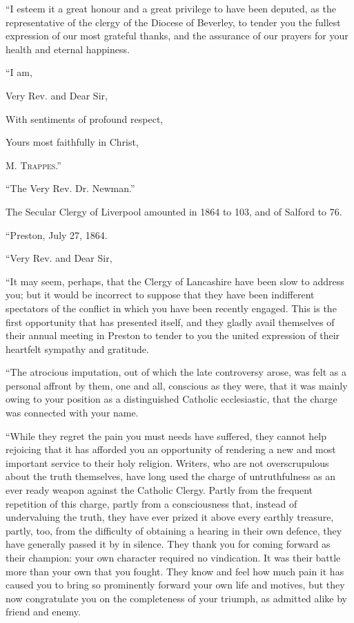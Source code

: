 ``I esteem it a great honour and a great privilege to have been
deputed, as the representative of the clergy of the Diocese of Beverley,
to tender you the fullest expression of our most grateful thanks, and
the assurance of our prayers for your health and eternal happiness.

``I am,

Very Rev. and Dear Sir,

With sentiments of profound respect,

Yours most faithfully in Christ,

M. T\textsc{rappes}.''

``The Very Rev. Dr. Newman.''


The Secular Clergy of Liverpool amounted in 1864 to 103, and of
Salford to 76.

``Preston, July 27, 1864.

``Very Rev. and Dear Sir,

``It may seem, perhaps, that the Clergy of Lancashire have been slow
to address you; but it would be incorrect to suppose that they have been
indifferent spectators of the conflict in which you have been recently
engaged. This is the first opportunity that has presented itself, and
they gladly avail themselves of their annual meeting in Preston to
tender to you the united expression of their heartfelt sympathy and
gratitude.

``The atrocious imputation, out of which the late controversy
arose, was felt as a personal affront by them, one and all, conscious as they were, that it was mainly owing to your position as a
distinguished Catholic ecclesiastic, that the charge was connected with
your name.

``While they regret the pain you must needs have suffered, they
cannot help rejoicing that it has afforded you an opportunity of
rendering a new and most important service to their holy religion.
Writers, who are not overscrupulous about the truth themselves, have
long used the charge of untruthfulness as an ever ready weapon against
the Catholic Clergy. Partly from the frequent repetition of this charge,
partly from a consciousness that, instead of undervaluing the truth,
they have ever prized it above every earthly treasure, partly, too, from
the difficulty of obtaining a hearing in their own defence, they have
generally passed it by in silence. They thank you for coming forward as
their champion: your own character required no vindication. It was their
battle more than your own that you fought. They know and feel how much
pain it has caused you to bring so prominently forward your own life and
motives, but they now congratulate you on the completeness of your
triumph, as admitted alike by friend and enemy.

